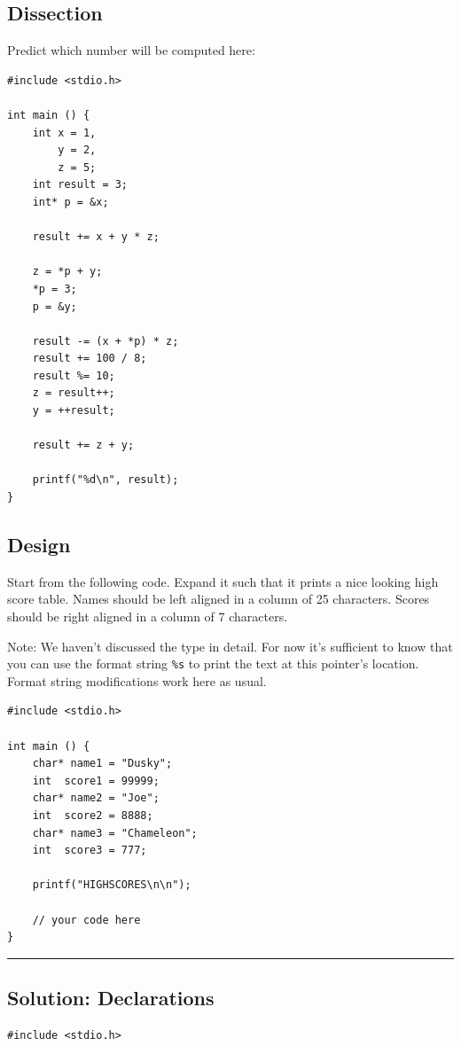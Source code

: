 {{{{\subsection*{Dissection}
Predict which number will be computed here:
\begin{codebox}[exo3-3.c]
\begin{verbatim}
#include <stdio.h>

int main () {
    int x = 1,
        y = 2,
        z = 5;
    int result = 3;
    int* p = &x;
    
    result += x + y * z;
    
    z = *p + y;
    *p = 3;
    p = &y;
    
    result -= (x + *p) * z;
    result += 100 / 8;
    result %= 10;
    z = result++;
    y = ++result;
    
    result += z + y;
   
    printf("%d\n", result);
}
\end{verbatim}
\end{codebox}

\subsection*{Design}
Start from the following code. Expand it such that it prints a nice looking high score table. Names should be left aligned in a column of 25 characters. Scores should be right aligned in a column of 7 characters.

Note:  We haven't discussed the type  in detail. For now it's sufficient to know that you can use the format string \texttt{\%s} to print the text at this pointer's location. Format string modifications work here as usual.
\begin{codebox}[exo3-3.c]
\begin{verbatim}
#include <stdio.h>

int main () {
    char* name1 = "Dusky";
    int  score1 = 99999;
    char* name2 = "Joe";
    int  score2 = 8888;
    char* name3 = "Chameleon";
    int  score3 = 777;
   
    printf("HIGHSCORES\n\n");
    
    // your code here
}
\end{verbatim}
\end{codebox}


\rule{\linewidth}{0.1mm}

\subsection*{Solution: Declarations}
\begin{codebox}[exo3-1.c]
\begin{verbatim}
#include <stdio.h>


\end{verbatim}
\end{codebox}}}}}
